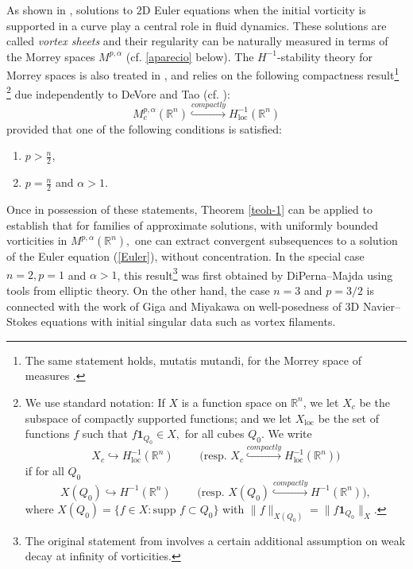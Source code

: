 \documentclass[11pt, a4paper,leqno]{amsart}
\theoremstyle{plain}
\numberwithin{equation}{section}
\theoremstyle{definition}
\theoremstyle{remark}
\def\R{\mathbb{R}}
\begin{document}
As shown in \cite{DiPernaMajda}, solutions to $2$D Euler equations when the initial vorticity is supported in a curve play a central role in fluid dynamics.  These solutions are called \emph{vortex sheets} and their regularity can be naturally  measured in terms of the Morrey spaces $M^{p,\alpha}$ (cf. \eqref{aparecio} below). The $H^{-1}$-stability theory for Morrey spaces is also
treated in \cite{LNT}, and relies on the following compactness
result\footnote{The same statement holds, mutatis mutandi, for the Morrey
space of measures \cite[Theorem 4.3]{LNT}.} \footnote{ We use standard notation: If $X$ is a function space on $\R^n$, we let
$X_{c}$ be the subspace of compactly supported functions; and we let $X_{\text{loc}}$ be
the set of functions $f$ such that $f \mathbf{1}_{Q_0}\in X,$ for all cubes 
$Q_0.$ We write%
\[
X_{c}\hookrightarrow H_{\text{loc}}^{-1}(\R^n) \qquad \text{ (resp. }X_{c}%
\overset{compactly}{\hookrightarrow}H_{\text{loc}}^{-1}(\R^n))
\]
if for all $Q_0$
\[
X(Q_0)\hookrightarrow H^{-1} (\R^n) \qquad \text{ (resp. }X(Q_0
)\overset{compactly}{\hookrightarrow}H^{-1}(\R^n)),
\]
where $X(Q_0) = \{f \in X : \text{supp } f \subset Q_0\}$ with $\|f\|_{X(Q_0)} = \|f \mathbf{1}_{Q_0}\|_{X}$.
} due independently to DeVore and Tao (cf. \cite[Theorems 4.2]{LNT}):
\begin{equation}
M^{p,\alpha}_c(\R^n)\overset{compactly}{\hookrightarrow}H^{-1}_{\text{loc}}(\R^n
)\label{comp}%
\end{equation}
provided that one of the following conditions is satisfied:
\begin{enumerate}
\item[(a)] $p>\frac{n}{2}$,
\item[(b)] $p=\frac{n}{2}$ \quad and \quad  $\alpha>1.$
\end{enumerate}
Once in possession of these statements, Theorem \ref{teoh-1} can be applied to establish that for families of approximate
solutions, with uniformly bounded vorticities in $M^{p,\alpha}(\R^n),$ one
can extract convergent subsequences to a solution of the Euler equation
(\ref{Euler}), without concentration. In the special case $n=2, p=1$ and $\alpha > 1$, this result\footnote{The original statement from \cite{DiPernaMajda} involves a certain additional  assumption on weak decay at infinity of vorticities.} was first obtained by DiPerna--Majda \cite[Theorem 3.1]{DiPernaMajda} using tools from elliptic theory. On the other hand, the case $n=3$ and $p = 3/2$ is connected with the work of Giga and Miyakawa \cite{Giga} on well-posedness of $3$D Navier--Stokes equations with initial singular data such as vortex filaments. 
\end{document}
